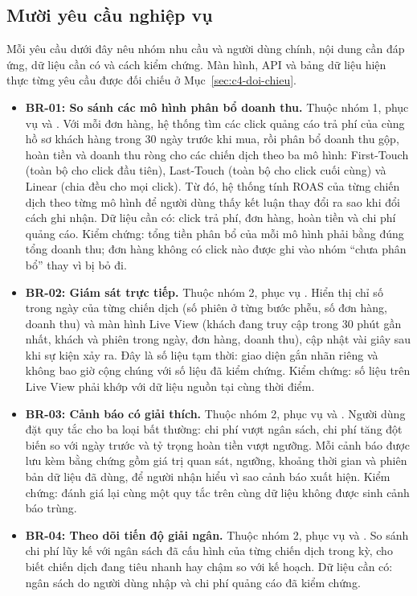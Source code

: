 \subsection{Mười yêu cầu nghiệp vụ}
\label{sec:c1-br-list}

Mỗi yêu cầu dưới đây nêu nhóm nhu cầu và người dùng chính, nội dung cần đáp ứng, dữ liệu cần có và cách kiểm chứng. Màn hình, API và bảng dữ liệu hiện thực từng yêu cầu được đối chiếu ở Mục~\ref{sec:c4-doi-chieu}.

\begin{itemize}
    \item {}\label{br:01}\textbf{BR-01: So sánh các mô hình phân bổ doanh thu.} Thuộc nhóm 1, phục vụ \shCMO{} và \shDA. Với mỗi đơn hàng, hệ thống tìm các click quảng cáo trả phí của cùng hồ sơ khách hàng trong 30 ngày trước khi mua, rồi phân bổ doanh thu gộp, hoàn tiền và doanh thu ròng cho các chiến dịch theo ba mô hình: First-Touch (toàn bộ cho click đầu tiên), Last-Touch (toàn bộ cho click cuối cùng) và Linear (chia đều cho mọi click). Từ đó, hệ thống tính ROAS của từng chiến dịch theo từng mô hình để người dùng thấy kết luận thay đổi ra sao khi đổi cách ghi nhận. Dữ liệu cần có: click trả phí, đơn hàng, hoàn tiền và chi phí quảng cáo. Kiểm chứng: tổng tiền phân bổ của mỗi mô hình phải bằng đúng tổng doanh thu; đơn hàng không có click nào được ghi vào nhóm ``chưa phân bổ'' thay vì bị bỏ đi.
    \item {}\label{br:02}\textbf{BR-02: Giám sát trực tiếp.} Thuộc nhóm 2, phục vụ \shPM. Hiển thị chỉ số trong ngày của từng chiến dịch (số phiên ở từng bước phễu, số đơn hàng, doanh thu) và màn hình Live View (khách đang truy cập trong 30 phút gần nhất, khách và phiên trong ngày, đơn hàng, doanh thu), cập nhật vài giây sau khi sự kiện xảy ra. Đây là số liệu tạm thời: giao diện gắn nhãn riêng và không bao giờ cộng chúng với số liệu đã kiểm chứng. Kiểm chứng: số liệu trên Live View phải khớp với dữ liệu nguồn tại cùng thời điểm.
    \item {}\label{br:03}\textbf{BR-03: Cảnh báo có giải thích.} Thuộc nhóm 2, phục vụ \shPM{} và \shCMO. Người dùng đặt quy tắc cho ba loại bất thường: chi phí vượt ngân sách, chi phí tăng đột biến so với ngày trước và tỷ trọng hoàn tiền vượt ngưỡng. Mỗi cảnh báo được lưu kèm bằng chứng gồm giá trị quan sát, ngưỡng, khoảng thời gian và phiên bản dữ liệu đã dùng, để người nhận hiểu vì sao cảnh báo xuất hiện. Kiểm chứng: đánh giá lại cùng một quy tắc trên cùng dữ liệu không được sinh cảnh báo trùng.
    \item {}\label{br:04}\textbf{BR-04: Theo dõi tiến độ giải ngân.} Thuộc nhóm 2, phục vụ \shCMO{} và \shPM. So sánh chi phí lũy kế với ngân sách đã cấu hình của từng chiến dịch trong kỳ, cho biết chiến dịch đang tiêu nhanh hay chậm so với kế hoạch. Dữ liệu cần có: ngân sách do người dùng nhập và chi phí quảng cáo đã kiểm chứng.

\end{itemize}
